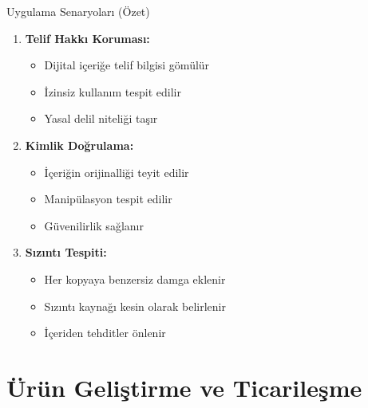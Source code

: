 \documentclass[aspectratio=169,xcolor={dvipsnames}]{beamer}
\begin{document}
\begin{frame}{Uygulama Senaryoları (Özet)}
    \begin{enumerate} %
        \item \textbf{Telif Hakkı Koruması:}
            \begin{itemize}
            \item Dijital içeriğe telif bilgisi gömülür
            \item İzinsiz kullanım tespit edilir
            \item Yasal delil niteliği taşır
            \end{itemize}

        \item \textbf{Kimlik Doğrulama:}
            \begin{itemize}
            \item İçeriğin orijinalliği teyit edilir
            \item Manipülasyon tespit edilir
            \item Güvenilirlik sağlanır
            \end{itemize}

        \item \textbf{Sızıntı Tespiti:}
            \begin{itemize}
            \item Her kopyaya benzersiz damga eklenir
            \item Sızıntı kaynağı kesin olarak belirlenir
            \item İçeriden tehditler önlenir
            \end{itemize}
    \end{enumerate}
\end{frame}

\section{Ürün Geliştirme ve Ticarileşme}
\end{document}
